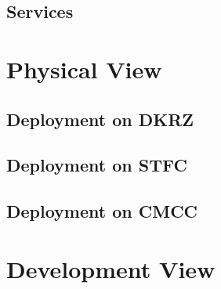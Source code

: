 \documentclass{../../template/esiwace-report}
\begin{document}
\todo{}

\subsection{Services}

\todo{}

\section{Physical View} %

\todo{}

\subsection{Deployment on DKRZ}

\todo{}

\subsection{Deployment on STFC}

\todo{}

\subsection{Deployment on CMCC}

\todo{}

\section{Development View} %

\todo{}







\end{document}
